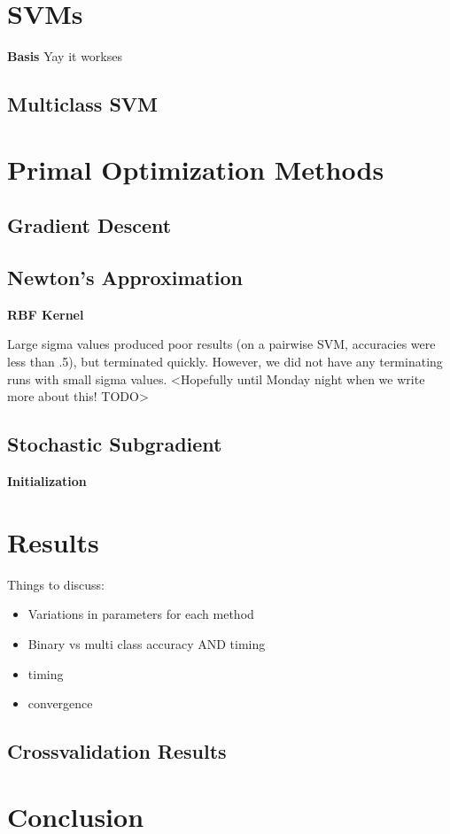 \documentclass[letterpaper, 11pt]{article}
\begin{document}
\section{SVMs}

\textbf{Basis} Yay it workses

\subsection{Multiclass SVM}

\section{Primal Optimization Methods}

\subsection{Gradient Descent}

\subsection{Newton's Approximation}

\textbf{RBF Kernel}

Large sigma values produced poor results (on a pairwise SVM, accuracies were less than .5), but terminated quickly.  However, we did not have any terminating runs with small sigma values. <Hopefully until Monday night when we write more about this! TODO>


\subsection{Stochastic Subgradient}

\textbf{Initialization}


\section{Results}
Things to discuss:
\begin{itemize}
	\item Variations in parameters for each method
	\item Binary vs multi class accuracy AND timing
	\item timing
	\item convergence
\end{itemize}

\subsection{Crossvalidation Results}



\section{Conclusion}



\nocite{*}
 

\end{document}
